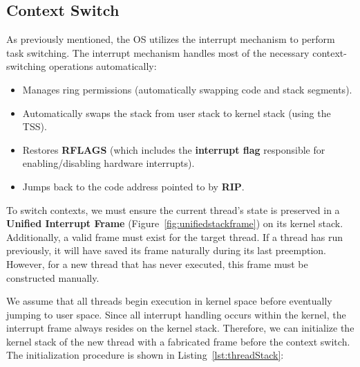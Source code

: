 \documentclass[a4paper,10pt,twoside]{report}
\theoremstyle{definition}
\begin{document}
\subsection{Context Switch}

As previously mentioned, the OS utilizes the interrupt mechanism to perform task switching. The interrupt mechanism handles most of the necessary context-switching operations automatically:
\begin{itemize}
\item Manages ring permissions (automatically swapping code and stack segments).
\item Automatically swaps the stack from user stack to kernel stack (using the TSS).
\item Restores \textbf{RFLAGS} (which includes the \textbf{interrupt flag} responsible for enabling/disabling hardware interrupts).
\item Jumps back to the code address pointed to by \textbf{RIP}.
\end{itemize}

To switch contexts, we must ensure the current thread's state is preserved in a \textbf{Unified Interrupt Frame} (Figure~\ref{fig:unifiedstackframe}) on its kernel stack. Additionally, a valid frame must exist for the target thread. If a thread has run previously, it will have saved its frame naturally during its last preemption. However, for a new thread that has never executed, this frame must be constructed manually. 

We assume that all threads begin execution in kernel space before eventually jumping to user space. Since all interrupt handling occurs within the kernel, the interrupt frame always resides on the kernel stack. Therefore, we can initialize the kernel stack of the new thread with a fabricated frame before the context switch. The initialization procedure is shown in Listing~\ref{lst:threadStack}:

\clearpage
\end{document}
